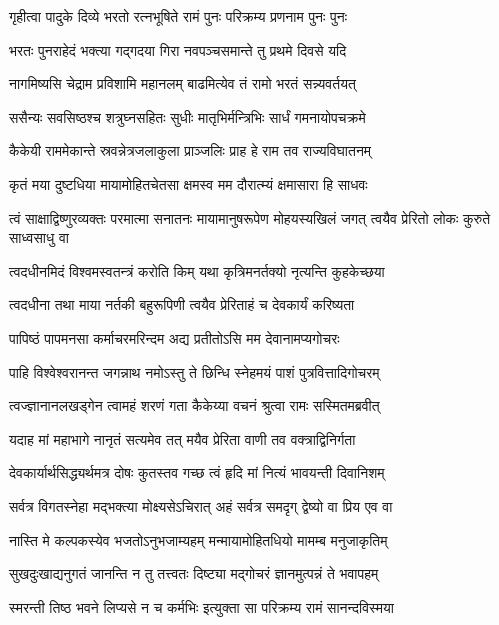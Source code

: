 \twolineshloka
{गृहीत्वा पादुके दिव्ये भरतो रत्नभूषिते}
{रामं पुनः परिक्रम्य प्रणनाम पुनः पुनः} %

\twolineshloka
{भरतः पुनराहेदं भक्त्या गद्गदया गिरा}
{नवपञ्चसमान्ते तु प्रथमे दिवसे यदि} %

\twolineshloka
{नागमिष्यसि चेद्राम प्रविशामि महानलम्}
{बाढमित्येव तं रामो भरतं सन्न्यवर्तयत्} %

\twolineshloka
{ससैन्यः सवसिष्ठश्च शत्रुघ्नसहितः सुधीः}
{मातृभिर्मन्त्रिभिः सार्धं गमनायोपचक्रमे} %

\twolineshloka
{कैकेयी राममेकान्ते स्रवन्नेत्रजलाकुला}
{प्राञ्जलिः प्राह हे राम तव राज्यविघातनम्} %

\twolineshloka
{कृतं मया दुष्टधिया मायामोहितचेतसा}
{क्षमस्व मम दौरात्म्यं क्षमासारा हि साधवः} %

\threelineshloka
{त्वं साक्षाद्विष्णुरव्यक्तः परमात्मा सनातनः}
{मायामानुषरूपेण मोहयस्यखिलं जगत्}
{त्वयैव प्रेरितो लोकः कुरुते साध्वसाधु वा} %

\twolineshloka
{त्वदधीनमिदं विश्वमस्वतन्त्रं करोति किम्}
{यथा कृत्रिमनर्तक्यो नृत्यन्ति कुहकेच्छया} %

\twolineshloka
{त्वदधीना तथा माया नर्तकी बहुरूपिणी}
{त्वयैव प्रेरिताहं च देवकार्यं करिष्यता} %

\twolineshloka
{पापिष्ठं पापमनसा कर्माचरमरिन्दम}
{अद्य प्रतीतोऽसि मम देवानामप्यगोचरः} %

\twolineshloka
{पाहि विश्वेश्वरानन्त जगन्नाथ नमोऽस्तु ते}
{छिन्धि स्नेहमयं पाशं पुत्रवित्तादिगोचरम्} %

\twolineshloka
{त्वज्ज्ञानानलखड्गेन त्वामहं शरणं गता}
{कैकेय्या वचनं श्रुत्वा रामः सस्मितमब्रवीत्} %

\twolineshloka
{यदाह मां महाभागे नानृतं सत्यमेव तत्}
{मयैव प्रेरिता वाणी तव वक्त्राद्विनिर्गता} %

\twolineshloka
{देवकार्यार्थसिद्ध्यर्थमत्र दोषः कुतस्तव}
{गच्छ त्वं हृदि मां नित्यं भावयन्ती दिवानिशम्} %

\twolineshloka
{सर्वत्र विगतस्नेहा मद्भक्त्या मोक्ष्यसेऽचिरात्}
{अहं सर्वत्र समदृग् द्वेष्यो वा प्रिय एव वा} %

\twolineshloka
{नास्ति मे कल्पकस्येव भजतोऽनुभजाम्यहम्}
{मन्मायामोहितधियो मामम्ब मनुजाकृतिम्} %

\twolineshloka
{सुखदुःखाद्यनुगतं जानन्ति न तु तत्त्वतः}
{दिष्ट्या मद्गोचरं ज्ञानमुत्पन्नं ते भवापहम्} %

\twolineshloka
{स्मरन्ती तिष्ठ भवने लिप्यसे न च कर्मभिः}
{इत्युक्ता सा परिक्रम्य रामं सानन्दविस्मया} %

